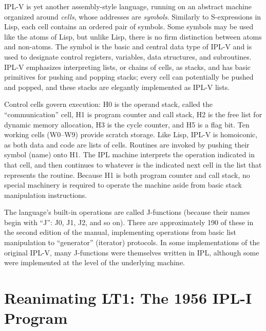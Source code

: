 \documentclass[journal]{IEEEtran}
\begin{document}
IPL-V is yet another assembly-style language, running on an abstract machine
organized around \textit{cells}, whose addresses are \textit{symbols}.
Similarly to S-expressions in Lisp, each cell contains an ordered pair of 
symbols.  Some symbols may be used like the atoms of Lisp, but unlike
Lisp, there is no firm distinction between atoms and non-atoms.
The symbol is the basic and central data type of IPL-V
and is used to designate control registers, variables, data structures,
and subroutines.
IPL-V emphasizes interpreting lists, or chains of cells,
as stacks, and has basic primitives for pushing and popping stacks;
every cell can potentially be pushed and popped, and these stacks are elegantly implemented as IPL-V lists.

Control cells
govern execution: H0 is the operand stack, called the
``communication'' cell, H1 is program counter and call
stack, H2 is the free list for dynamic memory allocation, H3 is
the cycle counter, and H5 is a flag bit. Ten working cells (W0--W9)
provide scratch storage. Like Lisp, IPL-V is homoiconic, as both
data and code are lists of cells. 
Routines
are invoked by pushing their symbol (name) onto H1. The IPL machine
interprets the operation indicated in that cell, and then continues to
whatever is the indicated next cell in the list that represents the routine. 
Because H1 is both
program counter and call stack, no special machinery is required to
operate the machine aside from basic stack manipulation instructions.

The language's built-in operations are called J-functions (because
their names begin with ``J'': J0, J1, J2, and so on). There are
approximately 190 of these in the second edition of the
manual, implementing operations from basic list
manipulation to ``generator'' (iterator) protocols. In some implementations
of the original
IPL-V, many J-functions were themselves written in IPL, although some
were implemented at the level of the underlying machine.

\section{Reanimating LT1: The 1956 IPL-I Program}
\label{sec:lt1}

\end{document}
